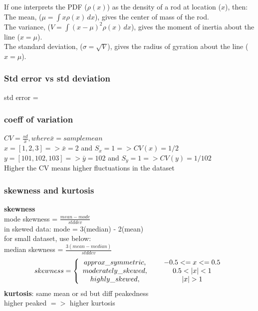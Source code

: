 \documentclass{beamer}
\begin{document}
\begin{frame}
	If one interprets the PDF ($\rho(x)$) as the density of a rod at location ($x$), then:\\
	
	The mean, ($\mu = \int x\rho(x)\,dx$), gives the center of mass of the rod.\\
	The variance, ($V = \int (x-\mu)^2\rho(x)\,dx$), gives the moment of inertia about the line ($x = \mu$).\\
	The standard deviation, ($\sigma = \sqrt{V}$), gives the radius of gyration about the line ($x = \mu$).
	
\end{frame}

\begin{frame}\frametitle{Std error vs std deviation}
	std error = 
\end{frame}


\begin{frame}\frametitle{coeff of variation}
	$CV = \frac{sd}{\bar{x}}, where  \bar{x}=sample mean$ \\
	$x = [1,2,3] => \bar{x}=2$ and $S_x=1 => CV(x)=1/2 $\\
	$y = [101,102,103] => \bar{y}=102$ and $S_y=1 => CV(y)=1/102 $\\
	Higher the CV means higher fluctuations in the dataset\\

\end{frame}


\begin{frame}\frametitle{skewness and kurtosis}
	\textbf{skewness}\\
	mode skewness = $\frac{mean-mode}{std dev}$\\
	in skewed data: mode = 3(median) - 2(mean) \\
	for small dataset, use below:\\
	median skewness = $\frac{3(mean-median)}{std dev}$\\
	\begin{align}
		skewness = \left\{ \begin{array}{cc} 
		approx\_symmetric, & \hspace{5mm} -0.5 <= x <=0.5 \\
		moderately\_skewed, & \hspace{5mm} 0.5< |x| <1 \\
		highly\_skewed, & \hspace{5mm} |x|>1 \\
				\end{array} \right.
	\end{align}
	\textbf{kurtosis}: same mean or sd but diff peakedness\\
	higher peaked $=>$ higher kurtosis \\	

\end{frame}
\end{document}
